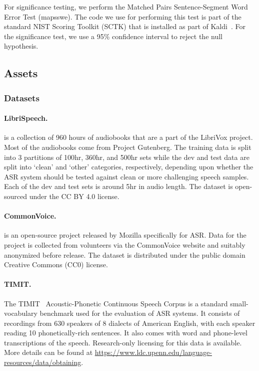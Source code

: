 \documentclass{article}
\begin{document}
For significance testing, we perform the Matched Pairs Sentence-Segment Word Error Test (mapsswe). The code we use for performing this test is part of the standard NIST Scoring Toolkit (SCTK) that is installed as part of Kaldi~\cite{kaldi}. For the significance test, we use a 95\% confidence interval to reject the null hypothesis. 
\subsection{Assets}
\subsubsection{Datasets}
\paragraph{LibriSpeech.} \citep{librispeech} is a collection of 960 hours of audiobooks that are a part of the LibriVox project. Most of the audiobooks come from Project Gutenberg. The training data is split into 3 partitions of 100hr, 360hr, and 500hr sets while the dev and test data are split into `clean’ and `other’ categories, respectively, depending upon whether the ASR system should be tested against clean or more challenging speech samples. Each of the dev and test sets is around 5hr in audio length. The dataset is open-sourced under the CC BY 4.0 license.
\paragraph{CommonVoice.} \citep{commonvoice} is an open-source project released by Mozilla specifically for ASR. Data for the project is collected from volunteers via the CommonVoice website and suitably anonymized before release. %
The dataset is distributed under the public domain Creative Commons (CC0) license.
\paragraph{TIMIT.}  The TIMIT~\citep{garofolo1993timit} Acoustic-Phonetic Continuous Speech Corpus is a standard small-vocabulary benchmark used for the evaluation of ASR systems. It consists of recordings from 630 speakers of 8 dialects of American English, with each speaker reading 10 phonetically-rich sentences. It also comes with  word and phone-level transcriptions of the speech. Research-only licensing for this data is available. More details can be found at \url{https://www.ldc.upenn.edu/language-resources/data/obtaining}. 
\end{document}
